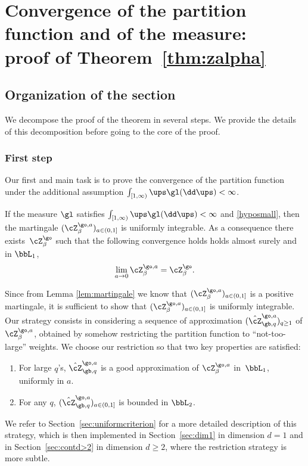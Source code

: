 \section{Convergence of the partition function and of the measure:\texorpdfstring{\\}{cr} proof of Theorem~\ref{thm:zalpha}}
\label{sec:UI}

\subsection{Organization of the section}
\label{sec:orga}

We decompose the proof of the theorem in several steps. We provide the details of this decomposition before going to the core of the proof.

\subsubsection*{First step}
Our first and main task is to prove the convergence of the partition function under the additional assumption $\int_{[1,\infty)} \ups \gl(\dd \ups)<\infty$.

\begin{proposition}
\label{thm:continuous2}
If the measure $\gl$ satisfies $\int_{[1,\infty)} \ups \gl(\dd \ups)<\infty$ and \eqref{hyposmall}, then the martingale
$(\cZ^{\go,a }_{\beta})_{a\in(0,1]}$
is uniformly integrable.
As a consequence there exists~$\cZ^{\go }_{ \beta}$ such that the following convergence holds holds almost surely and in $\bbL_1$,
\begin{equation*}
\lim_{a \to 0}\cZ^{\go,a }_{\beta}=\cZ^{\go }_{ \beta}.
\end{equation*}
\end{proposition}

Since from Lemma \ref{lem:martingale} we know that $(\cZ^{\go,a}_{\beta})_{a\in(0,1]}$ is a positive martingale,
it is sufficient to show that $(\cZ^{\go,a}_{\beta})_{a\in(0,1]}$ is uniformly integrable.
Our strategy consists in considering a sequence of approximation $(\hat \cZ_{\gb,q}^{\go,a})_{q\ge 1}$ of $\cZ^{\go,a}_{\beta}$,
obtained by somehow restricting the partition function
to ``not-too-large'' weights.
We choose our restriction so that two key properties are satisfied:
\begin{enumerate}\renewcommand{\theenumi}{\Alph{enumi}}
\item
For large $q$'s, $\hat \cZ_{\gb,q}^{\go,a}$ is a good approximation of $\cZ^{\go,a}_{\beta}$ in~$\bbL_1$, uniformly in $a$.
\item
For any $q$, $(\hat \cZ_{\gb,q}^{\go,a})_{a\in(0,1]}$ is bounded in $\bbL_2$.
\end{enumerate}
We refer to Section~\ref{sec:uniformcriterion} for
a more detailed description of this strategy, which is then implemented
in Section~\ref{sec:dim1} in dimension $d=1$ and in Section~\ref{sec:contd>2} in dimension $d\geq 2$, where the restriction strategy is more subtle.

